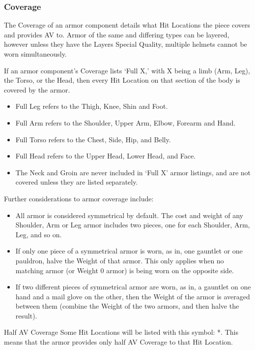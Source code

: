 \documentclass[oneside,11pt,english]{book}
\begin{document}
\subsubsection{Coverage}
The Coverage of an armor component details what Hit Locations the piece covers and provides AV to. Armor of the 
same and differing types can be layered, however unless they have the Layers Special Quality, multiple helmets 
cannot be worn simultaneously.

If an armor component’s Coverage lists ‘Full X,’ with X being a limb (Arm, Leg), the Torso, or the Head, then every 
Hit Location on that section of the body is covered by the armor. 

\begin{itemize}
\item Full Leg refers to the Thigh, Knee, Shin and Foot.
\item Full Arm refers to the Shoulder, Upper Arm, Elbow, Forearm and Hand.
\item Full Torso refers to the Chest, Side, Hip, and Belly.
\item Full Head refers to the Upper Head, Lower Head, and Face.
\item The Neck and Groin are never included in ‘Full X’ armor listings, and are not covered unless they are listed 
separately.
\end{itemize}

Further considerations to armor coverage include:
\begin{itemize}
\item All armor is considered symmetrical by default. The cost and weight of any Shoulder, Arm or Leg armor 
includes two pieces, one for each Shoulder, Arm, Leg, and so on.
\item If only one piece of a symmetrical armor is worn, as in, one gauntlet or one pauldron, halve the Weight of 
that armor. This only applies when no matching armor (or Weight 0 armor) is being worn on the opposite 
side.
\item If two different pieces of symmetrical armor are worn, as in, a gauntlet on one hand and a mail glove on 
the other, then the Weight of the armor is averaged between them (combine the Weight of the two armors, and then halve the result).
\end{itemize}

Half AV Coverage
Some Hit Locations will be listed with this symbol: *. This means that the armor provides only half AV Coverage to 
that Hit Location. 
	
\end{document}
